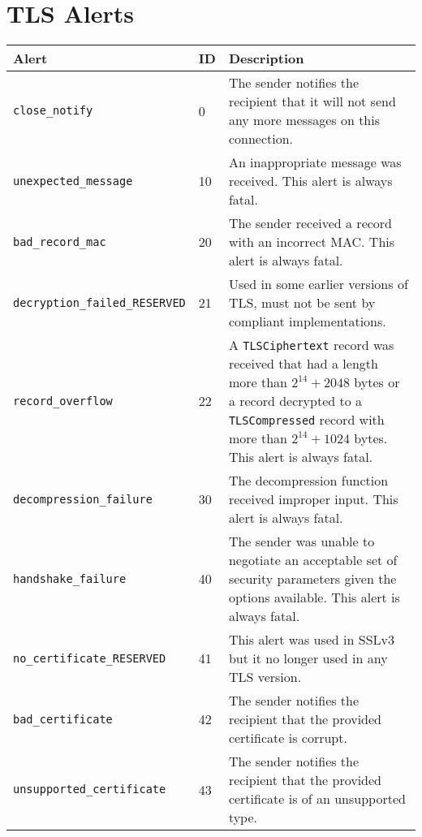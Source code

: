 \chapter{TLS Alerts}
    \noindent\begin{tabularx}{\linewidth}{@{}l l X}
    \caption{TLS Alerts}\label{tab:tls-alerts} \\
    \toprule
    \textbf{Alert} & \textbf{ID} & \textbf{Description} \\
    \midrule
    \endhead
    \texttt{close\_notify}                & 0   & The sender notifies the recipient that it will not send any more messages
                                                  on this connection. \\
    \texttt{unexpected\_message}          & 10  & An inappropriate message was received. This alert is always fatal. \\
    \texttt{bad\_record\_mac}             & 20  & The sender received a record with an incorrect MAC. This alert is always fatal. \\
    \texttt{decryption\_failed\_RESERVED} & 21  & Used in some earlier versions of TLS, must not be sent by compliant implementations. \\
    \texttt{record\_overflow}             & 22  & A \texttt{TLSCiphertext} record was received that had a length more than $2^{14}+2048$ bytes or
                                                  a record decrypted to a \texttt{TLSCompressed} record with more than $2^{14}+1024$ bytes. This alert
                                                  is always fatal. \\
    \texttt{decompression\_failure}       & 30  & The decompression function received improper input. This alert is always fatal. \\
    \texttt{handshake\_failure}           & 40  & The sender was unable to negotiate an acceptable set of security parameters given
                                                  the options available. This alert is always fatal. \\
    \texttt{no\_certificate\_RESERVED}    & 41  & This alert was used in SSLv3 but it no longer used in any TLS version. \\
    \texttt{bad\_certificate}             & 42  & The sender notifies the recipient that the provided certificate is corrupt. \\
    \texttt{unsupported\_certificate}     & 43  & The sender notifies the recipient that the provided certificate is of an unsupported type. \\

\end{tabularx}
